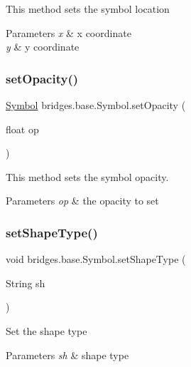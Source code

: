 This method sets the symbol location


\begin{DoxyParams}{Parameters}
{\em x} & x coordinate \\
\hline
{\em y} & y coordinate \\
\hline
\end{DoxyParams}
\mbox{\label{classbridges_1_1base_1_1_symbol_abac237b439448cbef3744817d14061c5}} 
\subsubsection{\texorpdfstring{setOpacity()}{setOpacity()}}
{\footnotesize\ttfamily \mbox{\hyperlink{classbridges_1_1base_1_1_symbol}{Symbol}} bridges.\+base.\+Symbol.\+set\+Opacity (\begin{DoxyParamCaption}\item[{float}]{op }\end{DoxyParamCaption})}



This method sets the symbol opacity. 


\begin{DoxyParams}{Parameters}
{\em op} & the opacity to set \\
\hline
\end{DoxyParams}
\mbox{\label{classbridges_1_1base_1_1_symbol_adf9559ecef8902f83cbb6bbefdf1c601}} 
\subsubsection{\texorpdfstring{setShapeType()}{setShapeType()}}
{\footnotesize\ttfamily void bridges.\+base.\+Symbol.\+set\+Shape\+Type (\begin{DoxyParamCaption}\item[{String}]{sh }\end{DoxyParamCaption})\hspace{0.3cm}{\ttfamily [protected]}}

Set the shape type 
\begin{DoxyParams}{Parameters}
{\em sh} & shape type \\
\hline
\end{DoxyParams}
\mbox{\label{classbridges_1_1base_1_1_symbol_a387a5a5691e55e84a1d0367ca2066806}} 
